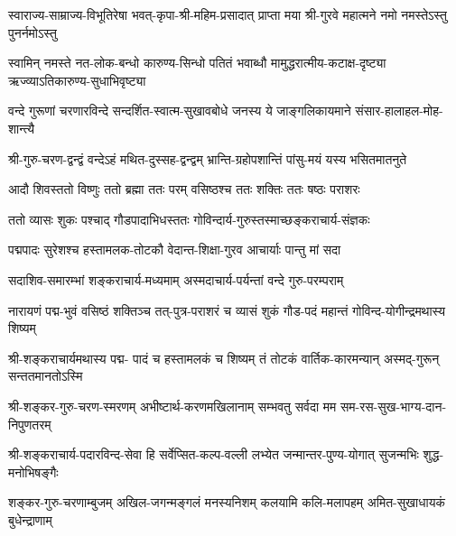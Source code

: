 \fourlineindentedshloka
{स्वाराज्य-साम्राज्य-विभूतिरेषा}
{भवत्-कृपा-श्री-महिम-प्रसादात्}
{प्राप्ता मया श्री-गुरवे महात्मने}
{नमो नमस्तेऽस्तु पुनर्नमोऽस्तु}

\fourlineindentedshloka
{स्वामिन् नमस्ते नत-लोक-बन्धो}
{कारुण्य-सिन्धो पतितं भवाब्धौ}
{मामुद्धरात्मीय-कटाक्ष-दृष्ट्या}
{ऋज्व्याऽतिकारुण्य-सुधाभिवृष्ट्या}


\fourlineindentedshloka
{वन्दे गुरूणां चरणारविन्दे}
{सन्दर्शित-स्वात्म-सुखावबोधे}
{जनस्य ये जाङ्गलिकायमाने}
{संसार-हालाहल-मोह-शान्त्यै}


\twolineshloka
{श्री-गुरु-चरण-द्वन्द्वं वन्देऽहं मथित-दुस्सह-द्वन्द्वम्}
{भ्रान्ति-ग्रहोपशान्तिं पांसु-मयं यस्य भसितमातनुते}



\twolineshloka
{आदौ शिवस्ततो विष्णुः ततो ब्रह्मा ततः परम्}
{वसिष्ठश्च ततः शक्तिः ततः षष्ठः पराशरः}

\twolineshloka
{ततो व्यासः शुकः पश्चाद् गौडपादाभिधस्ततः}
{गोविन्दार्य-गुरुस्तस्माच्छङ्कराचार्य-संज्ञकः}

\twolineshloka
{पद्मपादः सुरेशश्च हस्तामलक-तोटकौ}
{वेदान्त-शिक्षा-गुरव आचार्याः पान्तु मां सदा}


\twolineshloka
{सदाशिव-समारम्भां शङ्कराचार्य-मध्यमाम्}
{अस्मदाचार्य-पर्यन्तां वन्दे गुरु-परम्पराम्}

\fourlineindentedshloka
{नारायणं पद्म-भुवं वसिष्ठं}
{शक्तिञ्च तत्-पुत्र-पराशरं च}
{व्यासं शुकं गौड-पदं महान्तं}
{गोविन्द-योगीन्द्रमथास्य शिष्यम्}

\fourlineindentedshloka
{श्री-शङ्कराचार्यमथास्य पद्म-}
{पादं च हस्तामलकं च शिष्यम्}
{तं तोटकं वार्तिक-कारमन्यान्}
{अस्मद्-गुरून् सन्ततमानतोऽस्मि}




\twolineshloka
{श्री-शङ्कर-गुरु-चरण-स्मरणम् अभीष्टार्थ-करणमखिलानाम्}
{सम्भवतु सर्वदा मम सम-रस-सुख-भाग्य-दान-निपुणतरम्}

\twolineshloka
{श्री-शङ्कराचार्य-पदारविन्द-सेवा हि सर्वेप्सित-कल्प-वल्ली}
{लभ्येत जन्मान्तर-पुण्य-योगात् सुजन्मभिः शुद्ध-मनोभिषङ्गैः}

\twolineshloka
{शङ्कर-गुरु-चरणाम्बुजम् अखिल-जगन्मङ्गलं मनस्यनिशम्}
{कलयामि कलि-मलापहम् अमित-सुखाधायकं बुधेन्द्राणाम्}

